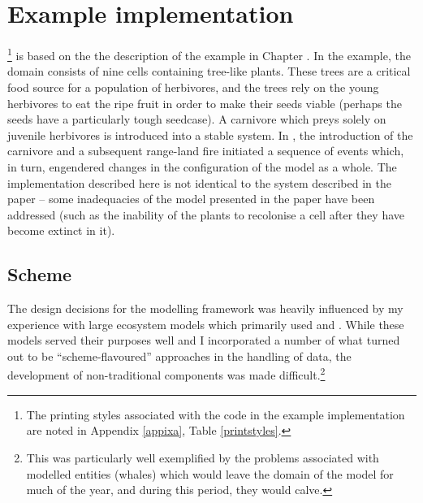 \section{Example implementation}

\ReModel\footnote{The printing styles associated with the code in the
example implementation are noted in Appendix \ref{appixa},
Table \ref{printstyles}.} is based on the the description of the
example in Chapter \Cthree. In the example, the domain consists of
nine cells containing tree-like plants. These trees are a critical
food source for a population of herbivores, and the trees rely on the
young herbivores to eat the ripe fruit in order to make their seeds
viable (perhaps the seeds have a particularly tough seedcase). A
carnivore which preys solely on juvenile herbivores is introduced into
a stable system.  In \Cthree, the introduction of the carnivore and a
subsequent range-land fire initiated a sequence of events which, in
turn, engendered changes in the configuration of the model as a whole.
The implementation described here is not identical to the system
described in the paper -- some inadequacies of the model presented in
the paper have been addressed (such as the inability of the plants to
recolonise a cell after they have become extinct in it).


\subsection{Scheme}
The design decisions for the modelling framework was heavily
influenced by my experience with large ecosystem models which
primarily used \Cpp and \CC.  While these models served their purposes
well and I incorporated a number of what turned out to be
``scheme-flavoured'' approaches in the handling of data, the
development of non-traditional components was made
difficult.\footnote{This was particularly well exemplified by the
problems associated with modelled entities (whales) which would leave
the domain of the model for much of the year, and during this period,
they would calve.}

